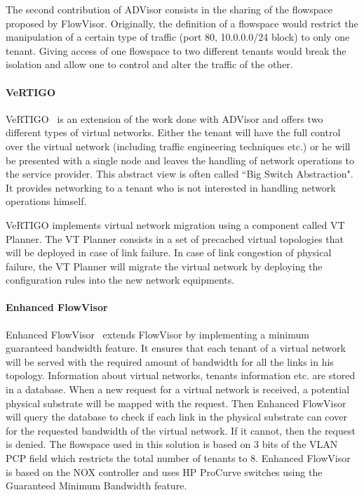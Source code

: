 The second contribution of ADVisor consists in the sharing of the flowspace proposed by FlowVisor.
Originally, the definition of a flowspace would restrict the manipulation of a certain type of traffic (\eg port 80, 10.0.0.0/24 block) to only one tenant.
Giving access of one flowspace to two different tenants would break the isolation and allow one to control and alter the traffic of the other.

\paragraph{VeRTIGO}
VeRTIGO~\cite{VeRTIGO-Corin2012a} is an extension of the work done with ADVisor and offers two different types of virtual networks.
Either the tenant will have the full control over the virtual network (including traffic engineering techniques etc.) or he will be presented with a single node and leaves the handling of network operations to the service provider.
This abstract view is often called ``Big Switch Abstraction".
It provides networking to a tenant who is not interested in handling network operations himself.

VeRTIGO implements virtual network migration using a component called VT Planner. The VT Planner consists in a set of precached virtual topologies that will be deployed in case of link failure. In case of link congestion of physical failure, the VT Planner will migrate the virtual network by deploying the configuration rules into the new network equipments.

\paragraph{Enhanced FlowVisor}
Enhanced FlowVisor~\cite{EnhancedFV-Min2012} extends FlowVisor by implementing a minimum guaranteed bandwidth feature. It ensures that each tenant of a virtual network will be served with the required amount of bandwidth for all the links in his topology. Information about virtual networks, tenants information etc. are stored in a database. When a new request for a virtual network is received, a potential physical substrate will be mapped with the request. Then Enhanced FlowVisor will query the database to check if each link in the physical substrate can cover for the requested bandwidth of the virtual network. If it cannot, then the request is denied. 
The flowspace used in this solution is based on 3 bits of the VLAN PCP field which restricts the total number of tenants to 8.
Enhanced FlowVisor is based on the NOX controller and uses HP ProCurve switches using the Guaranteed Minimum Bandwidth feature.

